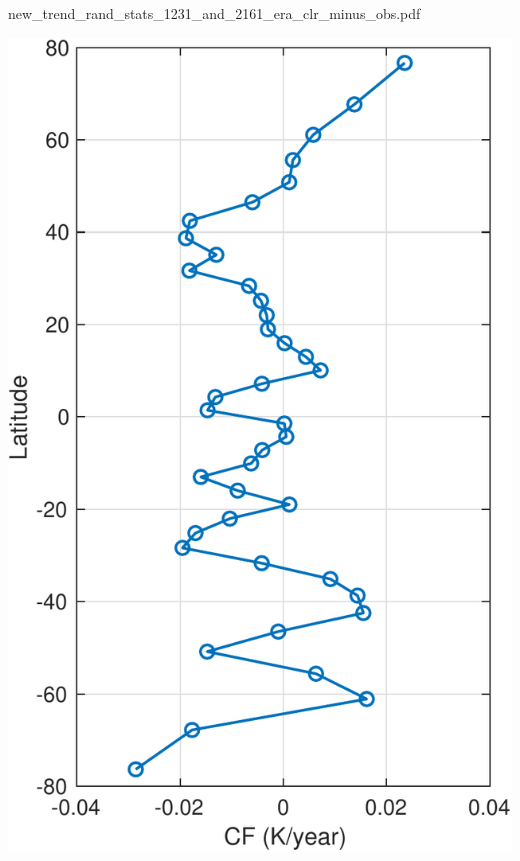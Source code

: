 \documentclass[presentation]{beamer}
\begin{document}
\begin{frame}[label={sec:org23baa54}]{new\_trend\_rand\_stats\_1231\_and\_2161\_era\_clr\_minus\_obs.pdf}
\begin{center}
\includegraphics[width=0.7\linewidth]{./Figs/Pdf/new_trend_rand_stats_1231_and_2161_era_clr_minus_obs.pdf}
\end{center}
\end{frame}
\end{document}
